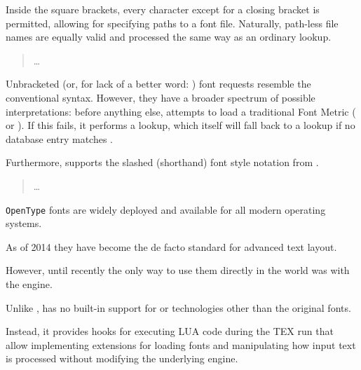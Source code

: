 {\begin{quote}
  \nonproportional{\string\font\string\fontname\space = [}%
  \nonproportional{]}
\end{quote}

\noindent
Inside the square brackets, every character except for a closing
bracket is permitted, allowing for specifying paths to a font file.
%
Naturally, path-less file names are equally valid and processed the
same way as an ordinary  lookup.

\begin{quote}
  \nonproportional{\string\font\string\fontname\space= }%
  \ldots
\end{quote}

Unbracketed (or, for lack of a better word: )
font requests resemble the conventional \TEX syntax.
%
However, they have a broader spectrum of possible interpretations:
before anything else,  attempts to load a
traditional \TEX Font Metric ( or ).
%
If this fails, it performs a  lookup, which itself will
fall back to a  lookup if no database entry matches
.

Furthermore,  supports the slashed (shorthand)
font style notation from \XETEX.

\begin{quote}
  \nonproportional{\string\font\string\fontname\space= }%
  \nonproportional{/}%
  \dots
\end{quote}





\texttt{OpenType} fonts are widely deployed and available for all modern
operating systems.

As of 2014 they have become the de facto standard for advanced text
layout.

However, until recently the only way to use them directly in the \tex
world was with the \XeTeX engine.

Unlike \XeTeX, \LUATEX has no built-in support for \OpenType or
technologies other than the original \tex fonts.

Instead, it provides hooks for executing LUA code during the TEX run
that allow implementing extensions for loading fonts and manipulating
how input text is processed without modifying the underlying engine.

}
